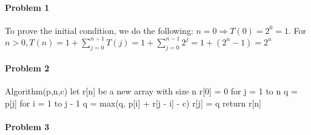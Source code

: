 \documentclass[11pt]{article}
\begin{document}
\MakeScribeTop


\paragraph{\noindent\textbf{\LARGE{Problem 1}}}


\begin{flushleft}
    To prove the initial condition, we do the following: $n = 0 \Rightarrow T(0)=2^0 = 1$.
    \newline
    For $n > 0, T(n) = 1 + \sum_{j = 0}^{n - 1}T(j) = 1 + \sum_{j = 0}^{n - 1}2^j = 1 + (2^n - 1) = 2^n$
\end{flushleft}   

\paragraph{\noindent\textbf{\LARGE{Problem 2}}}

\begin{flushleft}
Algorithm(p,n,c) \newline \null
    \quad let r[n] be a new array with size n \newline \null
    \quad r[0] = 0 \newline \null
    \quad for j = 1 to n \newline \null
        \quad \quad q = p[j] \newline \null
        \quad \quad for i = 1 to j - 1 \newline \null
            \quad \quad \quad q = max(q, p[i] + r[j - i] - c) \newline \null
        \quad \quad r[j] = q \newline \null
    \quad return r[n]
\end{flushleft} 

\paragraph{\noindent\textbf{\LARGE{Problem 3}}}
\end{document}
